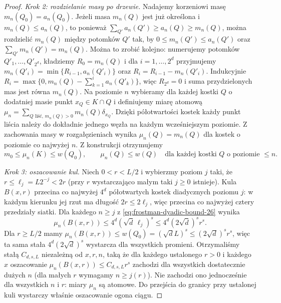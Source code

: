 \begin{proof}
\emph{Krok 2: rozdzielanie masy po drzewie.} Nadajemy
korzeniowi masę $m_n(Q_0)=a_n(Q_0)$.
Jeżeli masa $m_n(Q)$ jest już określona i
$m_n(Q)\le a_n(Q)$, to ponieważ
$\sum_{Q'}a_n(Q')\ge a_n(Q)\ge m_n(Q)$,
można rozdzielić $m_n(Q)$ między potomków $Q'$
tak, by $0\le m_n(Q')\le a_n(Q')$ oraz
$\sum_{Q'}m_n(Q')=m_n(Q)$. Można to zrobić kolejno: numerujemy potomków $Q'_1,\ldots,Q'_{2^d}$,
kładziemy $R_0=m_n(Q)$ i dla $i=1,\ldots,2^d$ przyjmujemy
$m_n(Q'_i)=\min\{R_{i-1},a_n(Q'_i)\}$ oraz
$R_i=R_{i-1}-m_n(Q'_i)$. Indukcyjnie
$R_i=\max\{0,m_n(Q)-\sum_{k=1}^i a_n(Q'_k)\}$,
więc $R_{2^d}=0$ i suma przydzielonych mas jest równa
$m_n(Q)$.
Na poziomie $n$ wybieramy dla każdej kostki
$Q$ o dodatniej masie punkt $x_Q\in K\cap Q$
i definiujemy miarę atomową
$\mu_n=\sum_{Q\text{ liść},\,m_n(Q)>0}m_n(Q)\delta_{x_Q}$.
Dzięki półotwartości kostek każdy punkt liścia należy
do dokładnie jednego węzła na każdym wcześniejszym
poziomie. Z zachowania masy w rozgałęzieniach wynika
$\mu_n(Q)=m_n(Q)$ dla kostek o poziomie co najwyżej $n$.
Z konstrukcji otrzymujemy
\begin{equation}\label{eq:frostman-dyadic-bound-26}
 m_0\le\mu_n(K)\le w(Q_0),\qquad
 \mu_n(Q)\le w(Q)
 \quad\text{dla każdej kostki }Q\text{ o poziomie }\le n.
\end{equation}

\emph{Krok 3: oszacowanie kul.} Niech $0<r<L/2$
i wybierzmy poziom $j$ taki, że
$r\le\ell_j=L2^{-j}<2r$ (przy $r$ wystarczająco
małym taki $j\ge0$ istnieje). Kula $B(x,r)$
przecina co najwyżej $4^d$ półotwartych kostek
diadycznych poziomu $j$: w każdym kierunku jej
rzut ma długość $2r\le2\ell_j$, więc przecina
co najwyżej cztery przedziały siatki.
Dla każdego $n\ge j$ z
\eqref{eq:frostman-dyadic-bound-26} wynika
\[
 \mu_n(B(x,r))\le4^d(\sqrt d\,\ell_j)^s
 \le4^d(2\sqrt d)^s r^s.
\]
Dla $r\ge L/2$ mamy
$\mu_n(B(x,r))\le w(Q_0)=(\sqrt d L)^s
\le(2\sqrt d)^s r^s$, więc ta sama stała $4^d(2\sqrt d)^s$
wystarcza dla wszystkich promieni.
Otrzymaliśmy stałą $C_{d,s,L}$ niezależną od $x,r,n$,
taką że dla każdego ustalonego $r>0$ i każdego $x$
oszacowanie $\mu_n(B(x,r))\le C_{d,s,L}r^s$
zachodzi dla wszystkich dostatecznie dużych $n$
(dla małych $r$ wymagamy $n\ge j(r)$).
Nie zachodzi ono jednocześnie dla wszystkich $n$ i $r$:
miary $\mu_n$ są atomowe. Do przejścia do granicy
przy ustalonej kuli wystarczy właśnie oszacowanie ogona ciągu.


\end{proof}
